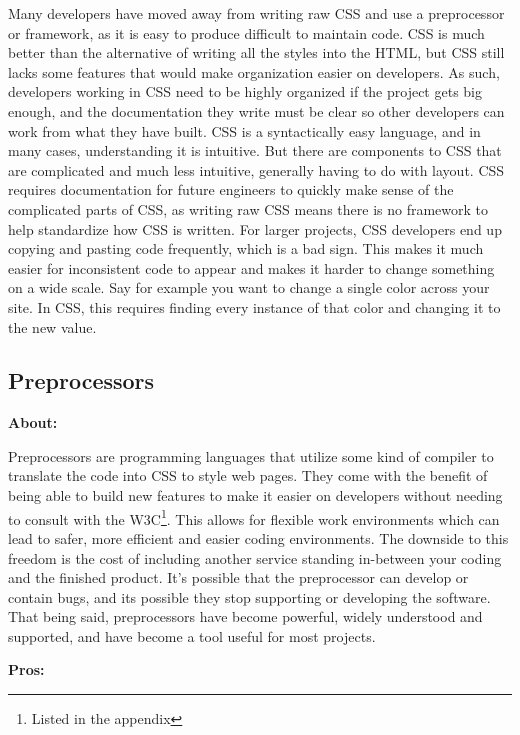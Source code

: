 \documentclass[draftclsnofoot,onecolumn,letterpaper,10pt,compsoc]{IEEEtran}
\begin{document}
    Many developers have moved away from writing raw CSS and use a preprocessor or framework, as it is easy to produce difficult to maintain code.
    CSS is much better than the alternative of writing all the styles into the HTML, but CSS still lacks some features that would make organization easier on developers.
    As such, developers working in CSS need to be highly organized if the project gets big enough, and the documentation they write must be clear so other developers can work from what they have built.
    CSS is a syntactically easy language, and in many cases, understanding it is intuitive.
    But there are components to CSS that are complicated and much less intuitive, generally having to do with layout.\cite{CSSProCon}
    CSS requires documentation for future engineers to quickly make sense of the complicated parts of CSS, as writing raw CSS means there is no framework to help standardize how CSS is written.
    For larger projects, CSS developers end up copying and pasting code frequently, which is a bad sign.
    This makes it much easier for inconsistent code to appear and makes it harder to change something on a wide scale.
    Say for example you want to change a single color across your site.
    In CSS, this requires finding every instance of that color and changing it to the new value.

  \subsection{Preprocessors}
    \textbf{About:}

    Preprocessors are programming languages that utilize some kind of compiler to translate the code into CSS to style web pages.
    They come with the benefit of being able to build new features to make it easier on developers without needing to consult with the W3C\footnote{Listed in the appendix}.
    This allows for flexible work environments which can lead to safer, more efficient and easier coding environments.
    The downside to this freedom is the cost of including another service standing in-between your coding and the finished product.
    It's possible that the preprocessor can develop or contain bugs, and its possible they stop supporting or developing the software.
    That being said, preprocessors have become powerful, widely understood and supported, and have become a tool useful for most projects.

    \textbf{Pros:}
\end{document}
